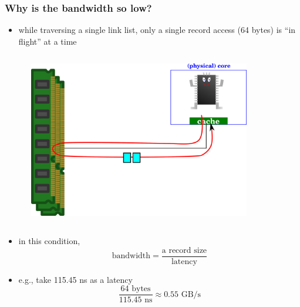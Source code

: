 \documentclass[12pt,dvipdfmx]{beamer}
\begin{document}
\begin{frame}[fragile]
\frametitle{Why is the bandwidth so low?}
\begin{itemize}
\item while traversing a single link list, 
  only a single record access (64 bytes) is ``in flight'' at a time

\begin{columns}
\begin{column}{0.5\textwidth}
\def\svgwidth{0.8\textwidth}
{\scriptsize }
\end{column}
\begin{column}{0.5\textwidth}
\includegraphics[width=0.8\textwidth]{out/pdf/svg/latency_very_large_1.pdf}
\end{column}
\end{columns}

\item in this condition,
\[ \mbox{bandwidth} = \frac{\mbox{a record size}}{\mbox{latency}} \]

\item e.g., take 115.45 ns as a latency
\[ \frac{64\mbox{ bytes}}{115.45\mbox{ ns}}
  \approx 0.55 \mbox{ GB/s} \]
\end{itemize}
\end{frame}
\end{document}
